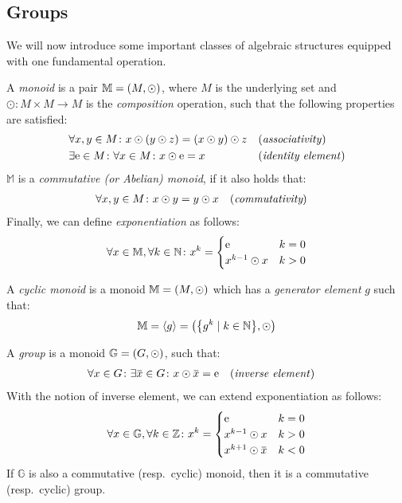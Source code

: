 \subsection{Groups}
We will now introduce some important classes of algebraic structures equipped with one fundamental 
operation. 
\begin{definition}[Monoid]
  A \emph{monoid} is a pair \(\mathbb{M} = \Tuple{M, \odot} \), where \(M\) is the 
  underlying set and \(\odot\colon M \times M \to M\) is the \emph{composition} 
  operation, such that the following properties are satisfied: 
  \begin{align*}
    & \forall x,y \in M\colon x \odot \Parens*{y \odot z} = \Parens*{x \odot y} \odot z
      && \textnormal{(\emph{associativity})} \\
    & \exists \id \in M\colon \forall x \in M\colon x \odot \id = x
      && \textnormal{(\emph{identity element})}
  \end{align*}
  \(\mathbb{M}\) is a \emph{commutative (or Abelian) monoid}, if it also holds that:
  \begin{align*}
    & \forall x,y \in M\colon x \odot y = y \odot x && (\emph{commutativity})
  \end{align*}
  Finally, we can define \emph{exponentiation} as follows:
  \begin{equation}\label{eq:exponentiation}    
    \forall x \in \mathbb{M}, \forall k \in \mathbb{N}\colon x^{k} = 
    \begin{cases}
      \id & k = 0 \\
      x^{k-1} \odot x & k > 0
    \end{cases}
  \end{equation}
\end{definition}

\begin{definition}
  A \emph{cyclic monoid} is a monoid \(\mathbb{M} = \Tuple{M, \odot}\) which has a 
  \emph{generator element} \(g\) such that:
  \[\mathbb{M} = \gengroup{g} = \Tuple{\Set{g^k \mid k \in \mathbb{N}}, \odot} \]
\end{definition}

\begin{definition}[Group]
  A \emph{group} is a monoid \(\mathbb{G} = \Tuple{G, \odot} \), such that: 
  \begin{align*}    
    & \forall x \in G\colon \exists \inv{x} \in G\colon x \odot \inv{x} = \id
    && \textnormal{(\emph{inverse element})}
  \end{align*}
  With the notion of inverse element, we can extend exponentiation as follows:
  \[
    \forall x \in \mathbb{G},\forall k \in \mathbb{Z}\colon x^k =
    \begin{cases}
      \id & k = 0 \\
      x^{k-1} \odot x & k > 0 \\
      x^{k+1} \odot \inv{x} & k < 0
    \end{cases}
  \]
  If \(\mathbb{G}\) is also a commutative (resp.\ cyclic) monoid, then it is a 
  commutative (resp.\ cyclic) group.
\end{definition}

